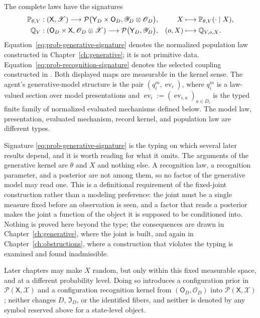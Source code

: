 The complete laws have the signatures
\begin{align}
\mathbb P_{\theta,V}&:(\mathsf X,\mathscr X)\longrightarrow\mathcal P\bigl(\mathsf Y_D\times\mathsf O_D,\mathscr Y_D\otimes\mathscr O_D\bigr),
&X&\longmapsto\mathbb P_{\theta,V}(\cdot\mid X),
\label{eq:prob-generative-signature}\\
\mathbb Q_V&:(\mathsf O_D\times\mathsf X,\mathscr O_D\otimes\mathscr X)\longrightarrow\mathcal P\bigl(\mathsf Y_D,\mathscr Y_D\bigr),
&(o,X)&\longmapsto\mathbb Q_{V,o,X}.
\label{eq:prob-recognition-signature}
\end{align}
Equation~\eqref{eq:prob-generative-signature} denotes the normalized population law constructed in Chapter~\ref{ch:generative}; it is not primitive data. Equation~\eqref{eq:prob-recognition-signature} denotes the selected coupling constructed in . Both displayed maps are measurable in the kernel sense. The agent's generative-model structure is the pair $(q_i^m,\operatorname{ev}_i)$, where $q_i^m$ is a law-valued section over model presentations and
\(\operatorname{ev}_i:=(\operatorname{ev}_{i,a})_{a\in D_i}\) is the typed finite family of normalized evaluated mechanisms defined below. The model law, presentation, evaluated mechanism, record kernel, and population law are different types. 
\medskip

Signature \eqref{eq:prob-generative-signature} is the typing on which several later results depend, and it is worth reading for what it omits. The arguments of the generative kernel are $\theta$ and $X$ and nothing else. A recognition law, a recognition parameter, and a posterior are not among them, so no factor of the generative model may read one. This is a definitional requirement of the fixed-joint construction rather than a modeling preference: the joint must be a single measure fixed before an observation is seen, and a factor that reads a posterior makes the joint a function of the object it is supposed to be conditioned into. Nothing is proved here beyond the type; the consequences are drawn in Chapter~\ref{ch:generative}, where the joint is built, and again in Chapter~\ref{ch:obstructions}, where a construction that violates the typing is examined and found inadmissible.

Later chapters may make $X$ random, but only within this fixed measurable space, and at a different probability level. Doing so introduces a configuration prior in $\mathcal P(\mathsf X,\mathscr X)$ and a configuration recognition kernel from $(\mathsf O_D,\mathscr O_D)$ into $\mathcal P(\mathsf X,\mathscr X)$; neither changes $D$, $\mathfrak I_D$, or the identified fibers, and neither is denoted by any symbol reserved above for a state-level object.

